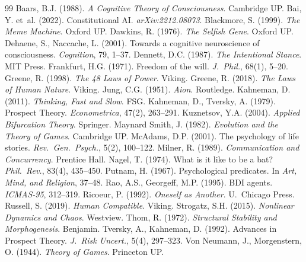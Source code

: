 \documentclass[12pt,a4paper,twoside]{article}
\theoremstyle{plain}
\theoremstyle{definition}
\theoremstyle{remark}
\begin{document}

\begin{thebibliography}{99}
 Baars, B.J. (1988). \textit{A Cognitive Theory of Consciousness}. Cambridge UP.
 Bai, Y. et~al. (2022). Constitutional AI. \textit{arXiv:2212.08073}.
 Blackmore, S. (1999). \textit{The Meme Machine}. Oxford UP.
 Dawkins, R. (1976). \textit{The Selfish Gene}. Oxford UP.
 Dehaene, S., Naccache, L. (2001). Towards a cognitive neuroscience of consciousness. \textit{Cognition}, 79, 1--37.
 Dennett, D.C. (1987). \textit{The Intentional Stance}. MIT Press.
 Frankfurt, H.G. (1971). Freedom of the will. \textit{J.~Phil.}, 68(1), 5--20.
 Greene, R. (1998). \textit{The 48 Laws of Power}. Viking.
 Greene, R. (2018). \textit{The Laws of Human Nature}. Viking.
 Jung, C.G. (1951). \textit{Aion}. Routledge.
 Kahneman, D. (2011). \textit{Thinking, Fast and Slow}. FSG.
 Kahneman, D., Tversky, A. (1979). Prospect Theory. \textit{Econometrica}, 47(2), 263--291.
 Kuznetsov, Y.A. (2004). \textit{Applied Bifurcation Theory}. Springer.
 Maynard Smith, J. (1982). \textit{Evolution and the Theory of Games}. Cambridge UP.
 McAdams, D.P. (2001). The psychology of life stories. \textit{Rev.~Gen.~Psych.}, 5(2), 100--122.
 Milner, R. (1989). \textit{Communication and Concurrency}. Prentice Hall.
 Nagel, T. (1974). What is it like to be a bat? \textit{Phil.~Rev.}, 83(4), 435--450.
 Putnam, H. (1967). Psychological predicates. In \textit{Art, Mind, and Religion}, 37--48.
 Rao, A.S., Georgeff, M.P. (1995). BDI agents. \textit{ICMAS-95}, 312--319.
 Ricoeur, P. (1992). \textit{Oneself as Another}. U.~Chicago Press.
 Russell, S. (2019). \textit{Human Compatible}. Viking.
 Strogatz, S.H. (2015). \textit{Nonlinear Dynamics and Chaos}. Westview.
 Thom, R. (1972). \textit{Structural Stability and Morphogenesis}. Benjamin.
 Tversky, A., Kahneman, D. (1992). Advances in Prospect Theory. \textit{J.~Risk Uncert.}, 5(4), 297--323.
 Von Neumann, J., Morgenstern, O. (1944). \textit{Theory of Games}. Princeton UP.
\end{thebibliography}
\end{document}
